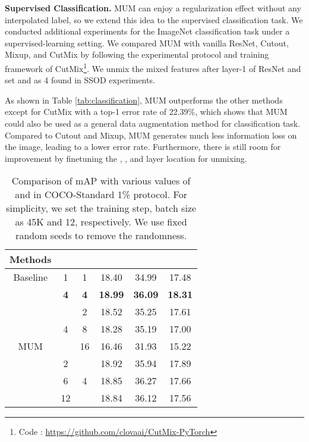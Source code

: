 \documentclass[10pt,twocolumn,letterpaper]{article}
\begin{document}
\noindent\textbf{Supervised Classification.}
MUM can enjoy a regularization effect without any interpolated label, so we extend this idea to the supervised classification task.
We conducted additional experiments for the ImageNet\cite{deng2009imagenet} classification task under a supervised-learning setting. 
We compared MUM with vanilla ResNet, Cutout, Mixup, and CutMix by following the experimental protocol and training framework of CutMix\footnote{Code : \url{https://github.com/clovaai/CutMix-PyTorch}}.
We unmix the mixed features after layer-1 of ResNet and set  and  as 4 found in SSOD experiments.

As shown in Table \ref{tab:classification}, MUM outperforms the other methods except for CutMix with a top-1 error rate of 22.39\%, which shows that MUM could also be used as a general data augmentation method for classification task.
Compared to Cutout and Mixup, MUM generates much less information loss on the image, leading to a lower error rate.
Furthermore, there is still room for improvement by finetuning the , , and layer location for unmixing.

\begin{table}[]
\caption{Comparison of mAP with various values of  and  in COCO-Standard 1\% protocol. For simplicity, we set the training step, batch size as 45K and 12, respectively. We use fixed random seeds to remove the randomness.}
\label{tab:ng_nt}
\centering
{}
{
\begin{tabular}{|c|c|c|ccc|}
\hline
Methods              &                  &                  &  &  &   \\ \hline
Baseline             & 1                  & 1                  & 18.40                         & 34.99                     & 17.48 \\ \hline
\multirow{7}{*}{MUM} & \textbf{4}         & \textbf{4}         & \textbf{18.99}               & \textbf{36.09}            & \textbf{18.31} \\ \cline{2-6} 
                     & \multirow{3}{*}{4} & 2                  & 18.52                        & 35.25                     & 17.61 \\
                     &                    & 8                  & 18.28                        & 35.19                     & 17.00    \\
                     &                    & 16                 & \color{red}16.46                        & \color{red}31.93                     & \color{red}15.22 \\ \cline{2-6} 
                     & 2                  & \multirow{3}{*}{4} & 18.92                        & 35.94                     & 17.89 \\
                     & 6                  &                    & 18.85                        & \color{blue}36.27                     & 17.66 \\
                     & 12                 &                    & 18.84                        & \color{blue}36.12                     & 17.56 \\ \hline
\end{tabular}
}
\vspace{-1mm}
\end{table}
\end{document}
